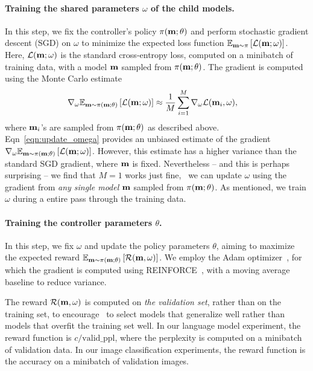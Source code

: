 \paragraph{Training the shared parameters $\omega$ of the child models.} In this step, we fix the controller's policy $\pi(\mathbf{m}; \theta)$ and perform stochastic gradient descent (SGD) on $\omega$ to minimize the expected loss function $\mathbb{E}_{\mathbf{m} \sim \pi} \left[ \mathcal{L}(\mathbf{m}; \omega) \right]$. Here, $\mathcal{L}(\mathbf{m}; \omega)$ is the standard cross-entropy loss, computed on a minibatch of training data, with a model $\mathbf{m}$ sampled from $\pi(\mathbf{m}; \theta)$. The gradient is computed using the Monte Carlo estimate
\begin{align}
  \label{eqn:update_omega}
  \nabla_\omega \mathbb{E}_{\mathbf{m} \sim \pi(\mathbf{m}; \theta)}
  \left[ \mathcal{L}(\mathbf{m}; \omega) \right]
    &\approx \frac{1}{M} \sum_{i=1}^{M} \nabla_\omega \mathcal{L}(\mathbf{m}_i, \omega),
\end{align}
where $\mathbf{m}_i$'s are sampled from $\pi(\mathbf{m}; \theta)$ as described above. Eqn~\ref{eqn:update_omega} provides an unbiased estimate of the gradient $\nabla_\omega \mathbb{E}_{\mathbf{m} \sim \pi(\mathbf{m}; \theta)} \left[ \mathcal{L}(\mathbf{m}; \omega) \right]$. However, this estimate has a higher variance than the standard SGD gradient, where $\mathbf{m}$ is fixed. Nevertheless -- and this is perhaps surprising -- we find that $M = 1$ works just fine, \ie~we can update $\omega$ using the gradient from \textit{any single model} $\mathbf{m}$ sampled from $\pi(\mathbf{m}; \theta)$. As mentioned, we train $\omega$ during a entire pass through the training data.

\paragraph{Training the controller parameters $\theta$.} In this step, we fix $\omega$ and update the policy parameters $\theta$, aiming to maximize the expected reward $\mathbb{E}_{\mathbf{m} \sim \pi(\mathbf{m}; \theta)}\left[ \mathcal{R}(\mathbf{m}, \omega) \right]$. We employ the Adam optimizer~\citep{adam}, for which the gradient is computed using REINFORCE~\citep{reinforce}, with a moving average baseline to reduce variance.

The reward $\mathcal{R}(\mathbf{m}, \omega)$ is computed on \textit{the validation set}, rather than on the training set, to encourage \enas~to select models that generalize well rather than models that overfit the training set well. In our language model experiment, the reward function is $c/\text{valid\_ppl}$, where the perplexity is computed on a minibatch of validation data. In our image classification experiments, the reward function is the accuracy on a minibatch of validation images.

